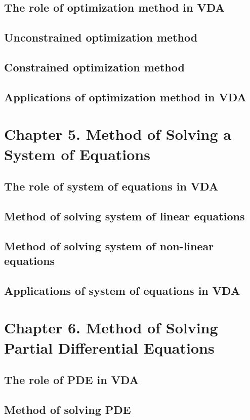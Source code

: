 \subsection{The role of optimization method in VDA}
\subsection{Unconstrained optimization method}
\subsection{Constrained optimization method}
\subsection{Applications of optimization method in VDA}

\section{Chapter 5. Method of Solving a System of Equations}
\subsection{The role of system of equations in VDA}
\subsection{Method of solving system of linear equations}
\subsection{Method of solving system of non-linear equations}
\subsection{Applications of system of equations in VDA}

\section{Chapter 6. Method of Solving Partial Differential Equations}
\subsection{The role of PDE in VDA}
\subsection{Method of solving PDE}
